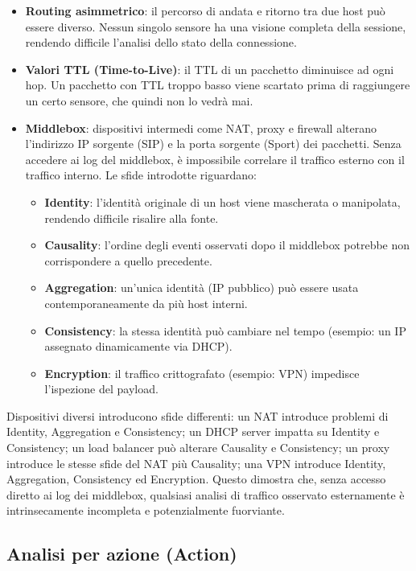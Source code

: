 \begin{itemize}
\item \textbf{Routing asimmetrico}: il percorso di andata e ritorno tra due host
può essere diverso. Nessun singolo sensore ha una visione completa della sessione,
rendendo difficile l'analisi dello stato della connessione.
\item \textbf{Valori TTL (Time-to-Live)}: il TTL di un pacchetto diminuisce ad
ogni hop. Un pacchetto con TTL troppo basso viene scartato prima di raggiungere
un certo sensore, che quindi non lo vedrà mai.
\item \textbf{Middlebox}: dispositivi intermedi come NAT, proxy e firewall
alterano l'indirizzo IP sorgente (SIP) e la porta sorgente (Sport) dei pacchetti.
Senza accedere ai log del middlebox, è impossibile correlare il traffico esterno
con il traffico interno. Le sfide introdotte riguardano:
\begin{itemize}
\item \textbf{Identity}: l'identità originale di un host viene mascherata o
manipolata, rendendo difficile risalire alla fonte.
\item \textbf{Causality}: l'ordine degli eventi osservati dopo il middlebox
potrebbe non corrispondere a quello precedente.
\item \textbf{Aggregation}: un'unica identità (IP pubblico) può essere usata
contemporaneamente da più host interni.
\item \textbf{Consistency}: la stessa identità può cambiare nel tempo
(esempio: un IP assegnato dinamicamente via DHCP).
\item \textbf{Encryption}: il traffico crittografato (esempio: VPN) impedisce
l'ispezione del payload.
\end{itemize}
\end{itemize}

Dispositivi diversi introducono sfide differenti: un NAT introduce problemi di
Identity, Aggregation e Consistency; un DHCP server impatta su Identity e
Consistency; un load balancer può alterare Causality e Consistency; un proxy
introduce le stesse sfide del NAT più Causality; una VPN introduce Identity,
Aggregation, Consistency ed Encryption.
Questo dimostra che, senza accesso diretto ai log dei middlebox, qualsiasi
analisi di traffico osservato esternamente è intrinsecamente incompleta
e potenzialmente fuorviante.

\subsection{Analisi per azione (Action)}

